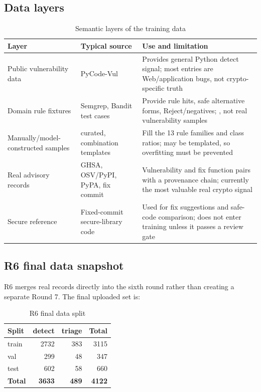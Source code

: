 \documentclass[11pt]{article}
\newcommand{\code}[1]{\texttt{\detokenize{#1}}}
\begin{document}
\subsection{Data layers}

\begin{table}[h]
\centering
\caption{Semantic layers of the training data}
\label{tab:data-layers-en}
\small
\begin{tabularx}{\linewidth}{L{2.5cm}L{2.2cm}Y}
\toprule
\textbf{Layer} & \textbf{Typical source} & \textbf{Use and limitation} \\
\midrule
Public vulnerability data & PyCode-Vul & Provides general Python detect signal; most entries are Web/application bugs, not crypto-specific truth \\
Domain rule fixtures & Semgrep, Bandit test cases & Provide rule hits, safe alternative forms, Reject/negatives; \code{verified=false}, not real vulnerability samples \\
Manually/model-constructed samples & curated, combination templates & Fill the 13 rule families and class ratios; may be templated, so overfitting must be prevented \\
Real advisory records & GHSA, OSV/PyPI, PyPA, fix commit & Vulnerability and fix function pairs with a provenance chain; currently the most valuable real crypto signal \\
Secure reference & Fixed-commit secure-library code & Used for fix suggestions and safe-code comparison; does not enter training unless it passes a review gate \\
\bottomrule
\end{tabularx}
\end{table}

\subsection{R6 final data snapshot}

R6 merges real records directly into the sixth round rather than creating a separate Round 7. The final
uploaded set is:

\begin{table}[h]
\centering
\caption{R6 final data split}
\label{tab:r6-split-en}
\small
\begin{tabular}{lrrr}
\toprule
\textbf{Split} & \textbf{detect} & \textbf{triage} & \textbf{Total} \\
\midrule
train & 2732 & 383 & 3115 \\
val & 299 & 48 & 347 \\
test & 602 & 58 & 660 \\
\midrule
\textbf{Total} & \textbf{3633} & \textbf{489} & \textbf{4122} \\
\bottomrule
\end{tabular}
\end{table}
\end{document}
